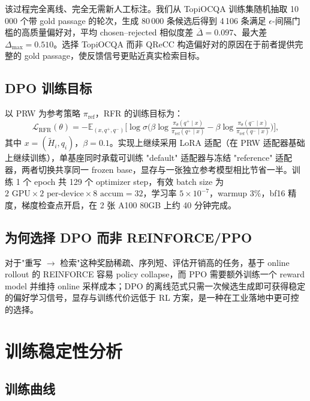 该过程完全离线、完全无需新人工标注。我们从 TopiOCQA 训练集随机抽取 10\,000 个带 gold passage 的轮次，生成 80\,000 条候选后得到 4\,106 条满足 $\epsilon$-间隔门槛的高质量偏好对，平均 chosen--rejected 相似度差 $\overline{\Delta}=0.097$、最大差 $\Delta_{\max}=0.510$。选择 TopiOCQA 而非 QReCC 构造偏好对的原因在于前者提供完整的 gold passage，使反馈信号更贴近真实检索目标。

\subsection{DPO 训练目标}

以 PRW 为参考策略 $\pi_{\text{ref}}$，RFR 的训练目标为：
\begin{equation}
\mathcal{L}_{\text{RFR}}(\theta) = - \mathbb{E}_{(x, q^+, q^-)}\Big[\log \sigma\big(\beta \log\tfrac{\pi_\theta(q^+\mid x)}{\pi_{\text{ref}}(q^+\mid x)} - \beta \log\tfrac{\pi_\theta(q^-\mid x)}{\pi_{\text{ref}}(q^-\mid x)}\big)\Big],
\label{eq:dpo}
\end{equation}
其中 $x = (\tilde H_i, q_i)$，$\beta=0.1$。实现上继续采用 LoRA 适配（在 PRW 适配器基础上继续训练），单基座同时承载可训练 "default" 适配器与冻结 "reference" 适配器，两者切换共享同一 frozen base，显存与一张独立参考模型相比节省一半。训练 1 个 epoch 共 129 个 optimizer step，有效 batch size 为 $2\text{ GPU}\times 2\text{ per-device}\times 8\text{ accum}=32$，学习率 $5\!\times\!10^{-7}$，warmup 3\%，bf16 精度，梯度检查点开启，在 2 张 A100 80GB 上约 40 分钟完成。

\subsection{为何选择 DPO 而非 REINFORCE/PPO}

对于"重写 $\to$ 检索"这种奖励稀疏、序列短、评估开销高的任务，基于 online rollout 的 REINFORCE 容易 policy collapse，而 PPO 需要额外训练一个 reward model 并维持 online 采样成本；DPO 的离线范式只需一次候选生成即可获得稳定的偏好学习信号，显存与训练代价远低于 RL 方案，是一种在工业落地中更可控的选择。

\section{训练稳定性分析}
\label{sec:rfr_stability}

\subsection{训练曲线}


